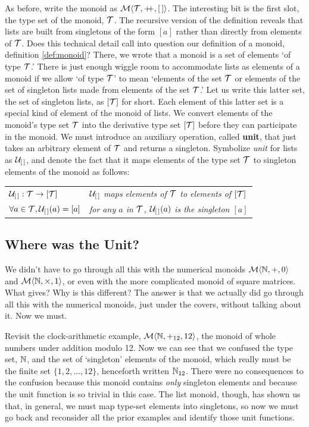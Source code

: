 As before, write the monoid as $\Mon{\T}{\pp}{\emptylist}$. The interesting bit is the first slot, the type set of the monoid, $\mathcal{T}$. The recursive version of the definition reveals that lists are built from singletons of the form $[a]$ rather than directly from elements of $\mathcal{T}$. Does this technical detail call into question our definition of a monoid, definition \ref{def:monoid}? There, we wrote that a monoid is a set of elements `of type $\mathcal{T}$.' There is just enough wiggle room to accommodate lists as elements of a monoid if we allow `of type $\mathcal{T}$' to mean `elements of the set $\mathcal{T}$ or elements of the set of singleton lists made from elements of the set $\mathcal{T}$.' Let us write this latter set, the set of singleton lists, as $[\mathcal{T}]$ for short. Each element of this latter set is a special kind of element of the monoid of lists. We convert elements of the monoid's type set $\mathcal{T}$ into the derivative type set $[\mathcal{T}]$ before they can participate in the monoid. We must introduce an auxiliary operation, called \textbf{unit}, that just takes an arbitrary element of $\mathcal{T}$ and returns a singleton. Symbolize \emph{unit} for lists as $\mathcal{U_{[\,]}}$, and denote the fact that it maps elements of the type set $\mathcal{T}$ to singleton elements of the monoid as follows:
\begin{center}
  \begin{tabular}{ll}
    $\mathcal{U_{[\,]}}:\mathcal{T}\rightarrow[\mathcal{T}]$ & \emph{$\mathcal{U_{[\,]}}$ maps elements of $\mathcal{T}$ to elements of $[\mathcal{T}]$}\\
    $\forall a\in \mathcal{T}, \mathcal{U_{[\,]}}(a)=[a]$ & \emph{for any $a$ in $\mathcal{T}$, $\mathcal{U_{[\,]}}(a)$ is the singleton $[a]$}
  \end{tabular}
\end{center}


\subsection{\color{Red}Where was the Unit?}


We didn't have to go through all this with the numerical monoids $\mathcal{M}\langle{\mathbb{N}},{+},{0}\rangle$ and $\mathcal{M}\langle{\mathbb{N}},{\times},{1}\rangle$, or even with the more complicated monoid of square matrices. What gives? Why is this different? The answer is that we actually did go through all this with the numerical monoids, just under the covers, without talking about it. Now we must.


Revisit the clock-arithmetic example, $\mathcal{M}\langle{\mathbb{N}},{+_{12}},{12}\rangle$, the monoid of whole numbers under addition modulo 12. Now we can see that we confused the type set, $\mathbb{N}$, and the set of `singleton' elements of the monoid, which really must be the finite set $\{1,2,\ldots,12\}$, henceforth written $\mathbb{N}_{12}$. There were no consequences to the confusion because this monoid contains \emph{only} singleton elements and because the unit function is so trivial in this case. The list monoid, though, has shown us that, in general, we must map type-set elements into singletons, so now we must go back and reconsider all the prior examples and identify those unit functions.


